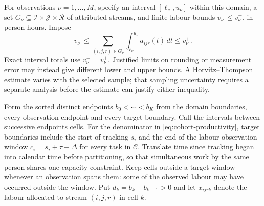 For observations $\nu=1,\ldots,M$, specify an interval $[\ell_\nu,u_\nu]$ within this domain, a set $G_\nu\subseteq\mathcal I\times\mathcal J\times\mathcal R$ of attributed streams, and finite labour bounds $v_\nu^-\leq v_\nu^+$, in person-hours. Impose
\begin{equation}
\label{eq:interval-information}
 v_\nu^-\leq
 \sum_{(i,j,r)\in G_\nu}\int_{\ell_\nu}^{u_\nu}a_{ijr}(t)\,dt
 \leq v_\nu^+.
\end{equation}
Exact interval totals use $v_\nu^-=v_\nu^+$. Justified limits on rounding or measurement error may instead give different lower and upper bounds. A Horvitz--Thompson estimate varies with the selected sample; that sampling uncertainty requires a separate analysis before the estimate can justify either inequality.

Form the sorted distinct endpoints $b_0<\cdots<b_K$ from the domain boundaries, every observation endpoint and every target boundary. Call the intervals between successive endpoints cells. For the denominator in \eqref{eq:cohort-productivity}, target boundaries include the start of tracking $s_i$ and the end of the labour observation window $c_i=s_i+\tau+\Delta$ for every task in $\mathcal C$. Translate time since tracking began into calendar time before partitioning, so that simultaneous work by the same person shares one capacity constraint. Keep cells outside a target window whenever an observation spans them: some of the observed labour may have occurred outside the window. Put $d_k=b_k-b_{k-1}>0$ and let $x_{ijrk}$ denote the labour allocated to stream $(i,j,r)$ in cell $k$.

